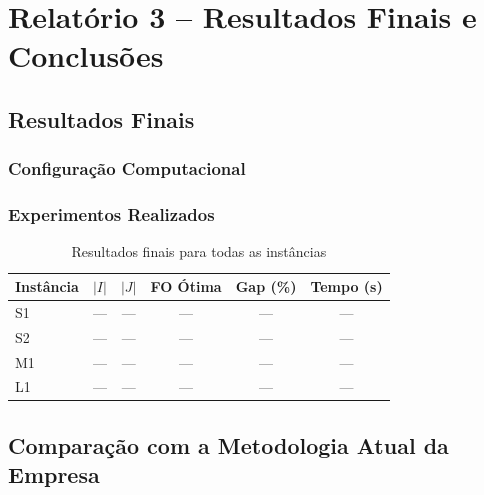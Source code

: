 
\section{Relatório 3 -- Resultados Finais e Conclusões}

\subsection{Resultados Finais}

\subsubsection{Configuração Computacional}
\lipsum[1]

\subsubsection{Experimentos Realizados}
\lipsum[2]

\begin{table}[H]
  \centering
  \caption{Resultados finais para todas as instâncias}
  \label{tab:resultados_r3}
  \begin{tabular}{lccccc}
    \toprule
    Instância & $|I|$ & $|J|$ & FO Ótima & Gap (\%) & Tempo (s) \\
    \midrule
    S1  & --- & --- & --- & --- & --- \\
    S2  & --- & --- & --- & --- & --- \\
    M1  & --- & --- & --- & --- & --- \\
    L1  & --- & --- & --- & --- & --- \\
    \bottomrule
  \end{tabular}
\end{table}

\subsection{Comparação com a Metodologia Atual da Empresa}

